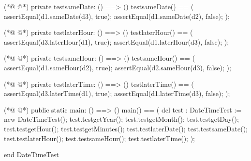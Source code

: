 \begin{vdmpp}[breaklines=true]
(*@
\label{testsameDate:124}
@*)
   private testsameDate: () ==> ()
    testsameDate() ==
    (
     assertEqual(d1.sameDate(d3), true);
     assertEqual(d1.sameDate(d2), false);
    );
    
(*@
\label{testlaterHour:131}
@*)
   private testlaterHour: () ==> ()
    testlaterHour() ==
    (
     assertEqual(d3.laterHour(d1), true);
     assertEqual(d1.laterHour(d3), false);
    );
    
(*@
\label{testsameHour:138}
@*)
   private testsameHour: () ==> ()
    testsameHour() ==
    (
     assertEqual(d1.sameHour(d2), true);
     assertEqual(d2.sameHour(d3), false);
    );
    
(*@
\label{testlaterTime:145}
@*)
   private testlaterTime: () ==> ()
    testlaterTime() ==
    (
     assertEqual(d3.laterTime(d1), true);
     assertEqual(d1.laterTime(d3), false);
    );
   
   
(*@
\label{main:153}
@*)
 public static main: () ==> ()
      main() ==
      (
       dcl test : DateTimeTest := new DateTimeTest();
      test.testgetYear();
       test.testgetMonth();
       test.testgetDay();
       test.testgetHour();
       test.testgetMinutes();
      test.testlaterDate();
        test.testsameDate();
        test.testlaterHour();
        test.testsameHour();
        test.testlaterTime();
       );
       
end DateTimeTest

\end{vdmpp}
